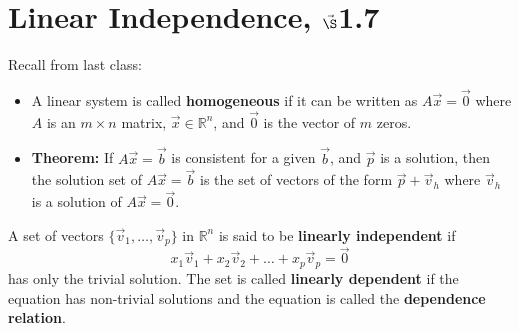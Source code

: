 


%


\section{{Linear Independence,  $\vec\S$1.7}}%
% 

%
\thispagestyle{fancy}

Recall from last class:

\begin{itemize}

\item A linear system is called {\bf homogeneous} if it can be written as $A\vec{x}=\vec{0}$ where $A$ is an $m \times n$ matrix, $\vec{x} \in \mathbb{R}^n$, and $\vec{0}$ is the vector of $m$ zeros. 
\item {\bf Theorem:} If $A\vec{x} =\vec{b}$ is consistent for a given $\vec{b}$, and $\vec{p}$ is a solution, then the solution set of $A\vec{x}=\vec{b}$ is the set of vectors of the form $\vec{p}+\vec{v}_h$ where $\vec{v}_h$ is a solution of $A\vec{x} =\vec{0}$.
\end{itemize}

\newpage

\begin{defn}
A set of vectors $\{ \vec{v}_1, \dots, \vec{v}_p\}$ in $\mathbb{R}^n$ is said to be {\bf linearly independent} if $$x_1 \vec{v}_1 +x_2 \vec{v}_2 +\dots +x_p \vec{v}_p = \vec{0}$$ has only the trivial solution. The set is called {\bf linearly dependent} if the equation has non-trivial solutions and the equation is called the {\bf dependence relation}.
\end{defn}

